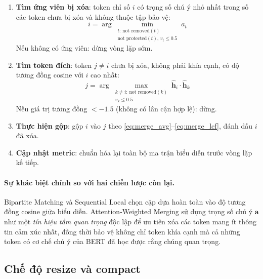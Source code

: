 \begin{enumerate}
  \item \textbf{Tìm ứng viên bị xóa}: token chỉ số $i$ có trọng số
    chú ý nhỏ nhất trong số các token chưa bị xóa và không thuộc tập
    bảo vệ:
    \begin{equation}
      i = \arg\min_{\substack{t:\, \text{not removed}(t)\\
            \text{not protected}(t),\, v_t \leq 0.5}}
        a_t
      \label{eq:find_min_attn}
    \end{equation}
    Nếu không có ứng viên: dừng vòng lặp sớm.

  \item \textbf{Tìm token đích}: token $j \neq i$ chưa bị xóa, không
    phải khía cạnh, có độ tương đồng cosine với $i$ cao nhất:
    \begin{equation}
      j = \arg\max_{\substack{k \neq i:\, \text{not removed}(k)\\
            v_k \leq 0.5}}
        \hat{\mathbf{h}}_i \cdot \hat{\mathbf{h}}_k
      \label{eq:find_neighbor}
    \end{equation}
    Nếu giá trị tương đồng $< -1.5$ (không có lân cận hợp lệ): dừng.

  \item \textbf{Thực hiện gộp}: gộp $i$ vào $j$ theo
    \eqref{eq:merge_avg}--\eqref{eq:merge_lcf}, đánh dấu $i$ đã xóa.

  \item \textbf{Cập nhật metric}: chuẩn hóa lại toàn bộ ma trận biểu
    diễn trước vòng lặp kế tiếp.
\end{enumerate}

\paragraph{Sự khác biệt chính so với hai chiến lược còn lại.}
Bipartite Matching và Sequential Local chọn cặp dựa hoàn toàn vào độ
tương đồng cosine giữa biểu diễn.  Attention-Weighted Merging sử dụng
trọng số chú ý $\mathbf{a}$ như một \textit{tín hiệu tầm quan trọng}
độc lập để ưu tiên xóa các token mang ít thông tin cảm xúc nhất, đồng
thời bảo vệ không chỉ token khía cạnh mà cả những token có cơ chế chú
ý của BERT đã học được rằng chúng quan trọng.

\subsection{Chế độ resize và compact}
\label{subsec:resize}

